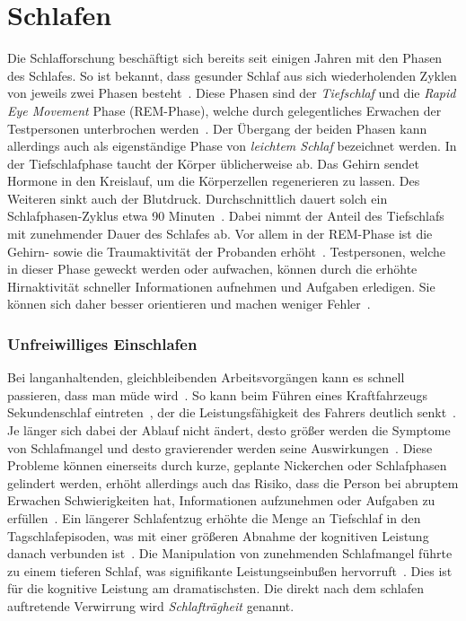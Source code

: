 \section{Schlafen}\label{sec:relatedWork.schlafen}

Die Schlafforschung beschäftigt sich bereits seit einigen Jahren mit den Phasen des Schlafes. So ist bekannt, dass gesunder Schlaf aus sich wiederholenden Zyklen von jeweils zwei Phasen besteht~\cite{broughton1968sleep}.
Diese Phasen sind der \textit{Tiefschlaf} und die \textit{Rapid Eye Movement} Phase (REM-Phase), welche durch gelegentliches Erwachen der Testpersonen unterbrochen werden~\cite{broughton1968sleep}. Der Übergang der beiden Phasen kann allerdings auch als eigenständige Phase von \textit{leichtem Schlaf} bezeichnet werden. 
In der Tiefschlafphase taucht der Körper üblicherweise ab. Das Gehirn sendet Hormone in den Kreislauf, um die Körperzellen regenerieren zu lassen. Des Weiteren sinkt auch der Blutdruck.
Durchschnittlich dauert solch ein Schlafphasen-Zyklus etwa 90 Minuten~\cite{broughton1968sleep}. Dabei nimmt der Anteil des Tiefschlafs mit zunehmender Dauer des Schlafes ab.
Vor allem in der REM-Phase ist die Gehirn- sowie die Traumaktivität der Probanden erhöht~\cite{gackenbach1991herrscher, broughton1968sleep}. Testpersonen, welche in dieser Phase geweckt werden oder aufwachen, können durch die erhöhte Hirnaktivität schneller Informationen aufnehmen und Aufgaben erledigen. Sie können sich daher besser orientieren und machen weniger Fehler~\cite{aschoff1985perception}. 

\subsubsection{Unfreiwilliges Einschlafen}

Bei langanhaltenden, gleichbleibenden Arbeitsvorgängen kann es schnell passieren, dass man müde wird~\cite{dinges1985assessing,kraemer2000time}. So kann beim Führen eines Kraftfahrzeugs Sekundenschlaf eintreten~\cite{ruhle2008sekundenschlaf, muttray2010videoanalyse,mccartt2000factors}, der die Leistungsfähigkeit des Fahrers deutlich senkt~\cite{boyle2008driver}. Je länger sich dabei der Ablauf nicht ändert, desto größer werden die Symptome von Schlafmangel und desto gravierender werden seine Auswirkungen~\cite{boyle2008driver,mccartt2000factors}.
Diese Probleme können einerseits durch kurze, geplante Nickerchen oder Schlafphasen gelindert werden, erhöht allerdings auch das Risiko, dass die Person bei abruptem Erwachen Schwierigkeiten hat, Informationen aufzunehmen oder Aufgaben zu erfüllen~\cite{dinges1985assessing}. 
Ein längerer Schlafentzug erhöhte die Menge an Tiefschlaf in den Tagschlafepisoden, was mit einer größeren Abnahme der kognitiven Leistung danach verbunden ist~\cite{dinges1985assessing}. Die Manipulation von zunehmenden Schlafmangel führte zu einem tieferen Schlaf, was signifikante Leistungseinbußen hervorruft~\cite{dinges1985assessing}. Dies ist für die kognitive Leistung am dramatischsten. Die direkt nach dem schlafen auftretende Verwirrung wird \textit{Schlafträgheit} genannt.

